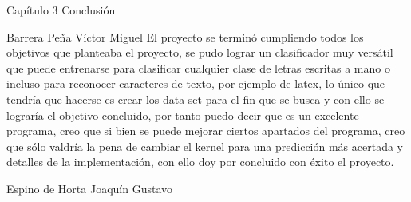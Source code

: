 \documentclass[
  spanish,
  ignorenonframetext,
]{beamer}
\begin{document}
\begin{frame}{Capítulo 3 Conclusión}
\protect\hypertarget{capuxedtulo-3-conclusiuxf3n}{}
\begin{block}{Barrera Peña Víctor Miguel}
\protect\hypertarget{barrera-peuxf1a-vuxedctor-miguel}{}
El proyecto se terminó cumpliendo todos los objetivos que planteaba el
proyecto, se pudo lograr un clasificador muy versátil que puede
entrenarse para clasificar cualquier clase de letras escritas a mano o
incluso para reconocer caracteres de texto, por ejemplo de latex, lo
único que tendría que hacerse es crear los data-set para el fin que se
busca y con ello se lograría el objetivo concluido, por tanto puedo
decir que es un excelente programa, creo que si bien se puede mejorar
ciertos apartados del programa, creo que sólo valdría la pena de cambiar
el kernel para una predicción más acertada y detalles de la
implementación, con ello doy por concluido con éxito el proyecto.
\end{block}

\begin{block}{Espino de Horta Joaquín Gustavo}
\protect\hypertarget{espino-de-horta-joaquuxedn-gustavo}{}
\end{block}
\end{frame}
\end{document}
